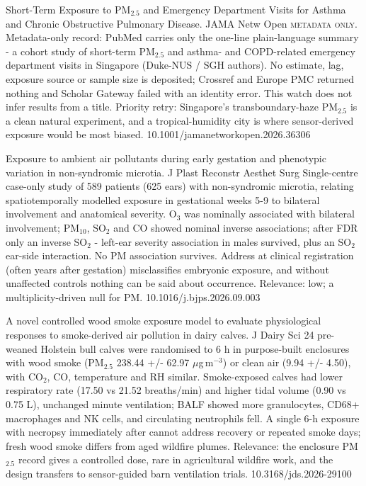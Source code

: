 \documentclass[10pt]{article}
\begin{document}
{Short-Term Exposure to PM$_{2.5}$ and Emergency Department Visits for Asthma and Chronic Obstructive Pulmonary Disease.}
{JAMA Netw Open}
{\textsc{metadata only.} Metadata-only record: PubMed carries only the one-line plain-language summary - a cohort study of short-term PM$_{2.5}$ and asthma- and COPD-related emergency department visits in Singapore (Duke-NUS / SGH authors). No estimate, lag, exposure source or sample size is deposited; Crossref and Europe PMC returned nothing and Scholar Gateway failed with an identity error. This watch does not infer results from a title. Priority retry: Singapore's transboundary-haze PM$_{2.5}$ is a clean natural experiment, and a tropical-humidity city is where sensor-derived exposure would be most biased.}
{10.1001/jamanetworkopen.2026.36306}

\par{}\baselineskip{}\baselineskip
{}

{Exposure to ambient air pollutants during early gestation and phenotypic variation in non-syndromic microtia.}
{J Plast Reconstr Aesthet Surg}
{Single-centre case-only study of 589 patients (625 ears) with non-syndromic microtia, relating spatiotemporally modelled exposure in gestational weeks 5-9 to bilateral involvement and anatomical severity. O$_3$ was nominally associated with bilateral involvement; PM$_{10}$, SO$_2$ and CO showed nominal inverse associations; after FDR only an inverse SO$_2$ - left-ear severity association in males survived, plus an SO$_2$ ear-side interaction. No PM association survives. Address at clinical registration (often years after gestation) misclassifies embryonic exposure, and without unaffected controls nothing can be said about occurrence. Relevance: low; a multiplicity-driven null for PM.}
{10.1016/j.bjps.2026.09.003}

\par{}\baselineskip{}\baselineskip
{}

{A novel controlled wood smoke exposure model to evaluate physiological responses to smoke-derived air pollution in dairy calves.}
{J Dairy Sci}
{24 pre-weaned Holstein bull calves were randomised to 6 h in purpose-built enclosures with wood smoke (PM$_{2.5}$ 238.44 +/- 62.97 $\mu$g\,m$^{-3}$) or clean air (9.94 +/- 4.50), with CO$_2$, CO, temperature and RH similar. Smoke-exposed calves had lower respiratory rate (17.50 vs 21.52 breaths/min) and higher tidal volume (0.90 vs 0.75 L), unchanged minute ventilation; BALF showed more granulocytes, CD68+ macrophages and NK cells, and circulating neutrophils fell. A single 6-h exposure with necropsy immediately after cannot address recovery or repeated smoke days; fresh wood smoke differs from aged wildfire plumes. Relevance: the enclosure PM$_{2.5}$ record gives a controlled dose, rare in agricultural wildfire work, and the design transfers to sensor-guided barn ventilation trials.}
{10.3168/jds.2026-29100}
\end{document}
